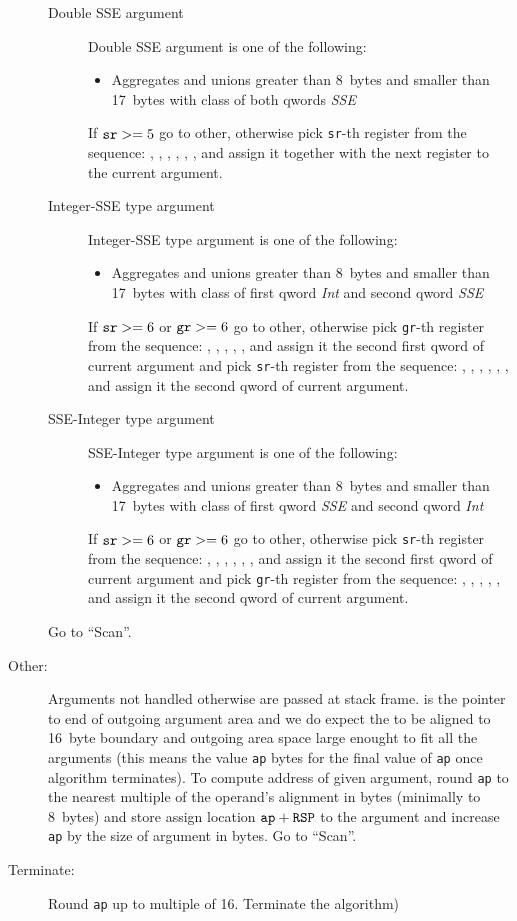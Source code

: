 \begin{description}
\begin{description}
\item[Double SSE argument]
Double SSE argument is one of the following:
\begin{itemize}
\item Aggregates and unions greater than 8~bytes and smaller than 17~bytes with class of both qwords \emph{SSE}
\end{itemize}
If $\verb|sr| >= 5$ go to other, otherwise pick \verb|sr|-th register from
the sequence: , , , , , , 
and assign it together with the
next register to the current argument.

\item[Integer-SSE type argument]
Integer-SSE type argument is one of the following:
\begin{itemize}
\item Aggregates and unions greater than 8~bytes and smaller than 17~bytes with class of first qword \emph{Int}
and second qword \emph{SSE}
\end{itemize}
If $\verb|sr| >= 6$ or $\verb|gr| >= 6$ go to other, otherwise pick \verb|gr|-th register from
the sequence: \RAX, \RDX, \RCX, \RBX, \RSI, \RDI 
and assign it the second first qword of current argument and pick \verb|sr|-th register from
the sequence: , , , , , , 
and assign it the second qword of current argument.

\item[SSE-Integer type argument]
SSE-Integer type argument is one of the following:
\begin{itemize}
\item Aggregates and unions greater than 8~bytes and smaller than 17~bytes with class of first qword \emph{SSE}
and second qword \emph{Int}
\end{itemize}
If $\verb|sr| >= 6$ or $\verb|gr| >= 6$ go to other, otherwise pick \verb|sr|-th register from
the sequence:
, , , , , , 
and assign it the second first qword of current argument and pick \verb|gr|-th register from
the sequence:
\RAX, \RDX, \RCX, \RBX, \RSI, \RDI 
and assign it the second qword of current argument.
\end{description}
Go to ``Scan''.

\item[Other:]
Arguments not handled otherwise are passed at stack frame. \RSP{} is the
pointer to end of outgoing argument area and we do expect the \RSP{} to be
aligned to 16~byte boundary and outgoing area space large enought to fit all
the arguments (this means the value \verb|ap| bytes for the final value of
\verb|ap| once algorithm terminates).  To compute address of given argument,
round \verb|ap| to the nearest multiple of the operand's alignment in bytes
(minimally to 8~bytes) and
store assign location $\verb|ap|+\RSP$ to the argument and increase \verb|ap| by
the size of argument in bytes.
Go to ``Scan''.

\item[Terminate:]
Round \verb|ap| up to multiple of 16. Terminate the algorithm)
\end{description}

